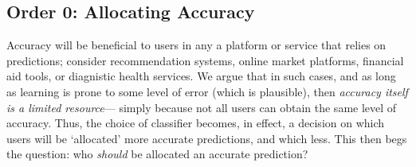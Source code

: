 



\subsection{Order 0: Allocating Accuracy} \label{sec:order0}
Accuracy will be beneficial to users in any a platform or service
that relies on predictions;
consider recommendation systems, online market platforms,
financial aid tools, or diagnistic health services.
We argue that in such cases,
and as long as
learning is prone to some level of error
(which is plausible), then
\emph{accuracy itself is a limited resource}---%
simply because not all users can obtain
the same level of accuracy.%
Thus, the choice of classifier becomes, in effect, a decision on which users will be `allocated' more accurate predictions, and which less. %
This then begs the question:
who \emph{should} be allocated an accurate prediction?
